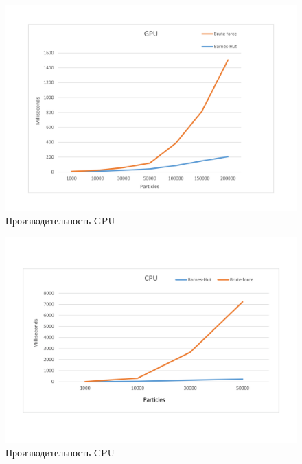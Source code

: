 \documentclass{article}
\begin{document}
\begin{figure}[H]
  \centering
  \includegraphics[width=\linewidth]{../images/gpu chart.png}
  \caption {Производительность GPU}
  \label {fig:gpu chart}
\end{figure}

\begin{figure}[H]
  \centering
  \includegraphics[width=\linewidth]{../images/CPU.png}
  \caption {Производительность CPU}
  \label {fig:cpu chart}
\end{figure}

\pagebreak
\end{document}
